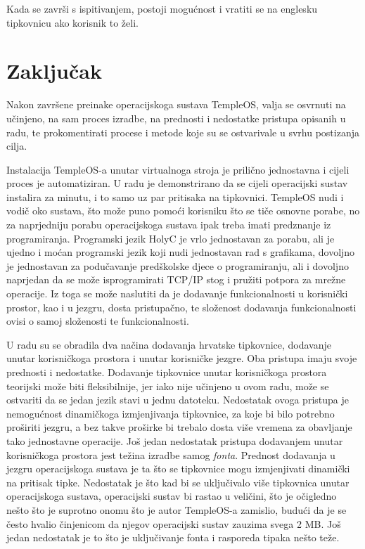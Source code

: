 \documentclass{foi}
\begin{document}
Kada se završi s ispitivanjem, postoji mogućnost i vratiti se na englesku tipkovnicu ako korisnik to želi.

\chapter{Zaključak}

Nakon završene preinake operacijskoga sustava TempleOS, valja se osvrnuti na učinjeno, na sam proces izradbe, na prednosti i nedostatke pristupa opisanih u radu, te prokomentirati procese i metode koje su se ostvarivale u svrhu postizanja cilja.

Instalacija TempleOS-a unutar virtualnoga stroja je prilično jednostavna i cijeli proces je automatiziran. U radu je demonstrirano da se cijeli operacijski sustav instalira za minutu, i to samo uz par pritisaka na tipkovnici. TempleOS nudi i vodič oko sustava, što može puno pomoći korisniku što se tiče osnovne porabe, no za naprjedniju porabu operacijskoga sustava ipak treba imati predznanje iz programiranja. Programski jezik HolyC je vrlo jednostavan za porabu, ali je ujedno i moćan programski jezik koji nudi jednostavan rad s grafikama, dovoljno je jednostavan za podučavanje predškolske djece o programiranju, ali i dovoljno naprjedan da se može isprogramirati TCP/IP stog i pružiti potpora za mrežne operacije. Iz toga se može naslutiti da je dodavanje funkcionalnosti u korisnički prostor, kao i u jezgru, dosta pristupačno, te složenost dodavanja funkcionalnosti ovisi o samoj složenosti te funkcionalnosti.

U radu su se obradila dva načina dodavanja hrvatske tipkovnice, dodavanje unutar korisničkoga prostora i unutar korisničke jezgre. Oba pristupa imaju svoje prednosti i nedostatke. Dodavanje tipkovnice unutar korisničkoga prostora teorijski može biti fleksibilnije, jer iako nije učinjeno u ovom radu, može se ostvariti da se jedan jezik stavi u jednu datoteku. Nedostatak ovoga pristupa je nemogućnost dinamičkoga izmjenjivanja tipkovnice, za koje bi bilo potrebno proširiti jezgru, a bez takve proširke bi trebalo dosta više vremena za obavljanje tako jednostavne operacije. Još jedan nedostatak pristupa dodavanjem unutar korisničkoga prostora jest težina izradbe samog \emph{fonta}. Prednost dodavanja u jezgru operacijskoga sustava je ta što se tipkovnice mogu izmjenjivati dinamički na pritisak tipke. Nedostatak je što kad bi se uključivalo više tipkovnica unutar operacijskoga sustava, operacijski sustav bi rastao u veličini, što je očigledno nešto što je suprotno onomu što je autor TempleOS-a zamislio, budući da je se često hvalio činjenicom da njegov operacijski sustav zauzima svega 2 MB. Još jedan nedostatak je to što je uključivanje fonta i rasporeda tipaka nešto teže.
\end{document}
